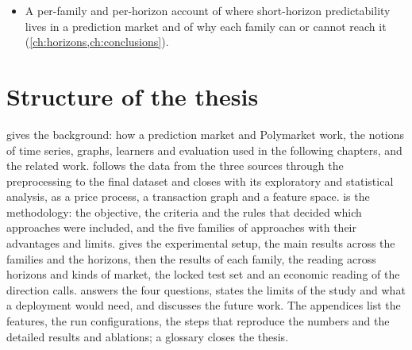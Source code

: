 \begin{itemize}[nosep]
  quantity as its own time series before mixing them, and a direct linear path from the
  recent price changes to the output that contains the mean-reversion rule as a special
  case, and the measurement of what its state is worth over the best stateless learner on
  the same inputs: a loss of one to two points at one hour that disappears when the trees
  are its base, a small, significant gain at one minute, alone and on top of the trees,
  and a smaller one on top of the trees at fifteen minutes (\cref{ch:stateful,ch:horizons}).
  \item A per-family and per-horizon account of where short-horizon predictability lives
  in a prediction market and of why each family can or cannot reach it
  (\cref{ch:horizons,ch:conclusions}).
\end{itemize}

\section{Structure of the thesis}
\label{sec:intro:structure}

 gives the background: how a prediction market and Polymarket work,
the notions of time series, graphs, learners and evaluation used in the following chapters,
and the related work.   follows the data from the three sources
through the preprocessing to the final dataset and closes with its exploratory and
statistical analysis, as a price process, a transaction graph and a feature space.
 is the methodology: the objective, the criteria and the rules that
decided which approaches were included, and the five families of approaches with their
advantages and limits.   gives the experimental setup, the
main results across the families and the horizons, then the results of each family, the
reading across horizons and kinds of market, the locked test set and an economic reading of
the direction calls.
 answers the four questions, states the limits of the study and what
a deployment would need, and discusses the future work.  The appendices list the features,
the run configurations, the steps that reproduce the numbers and the detailed results and
ablations; a glossary closes the thesis.

